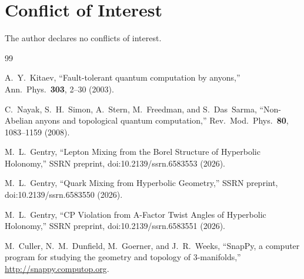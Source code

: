 \documentclass[12pt]{article}
\theoremstyle{definition}
\begin{document}
\section*{Conflict of Interest}
The author declares no conflicts of interest.

\begin{thebibliography}{99}

  A.~Y.~Kitaev,
  ``Fault-tolerant quantum computation by anyons,''
  Ann.\ Phys.\ \textbf{303}, 2--30 (2003).

  C.~Nayak, S.~H.~Simon, A.~Stern, M.~Freedman, and S.~Das~Sarma,
  ``Non-Abelian anyons and topological quantum computation,''
  Rev.\ Mod.\ Phys.\ \textbf{80}, 1083--1159 (2008).

  M.~L.~Gentry,
  ``Lepton Mixing from the Borel Structure of Hyperbolic Holonomy,''
  SSRN preprint, doi:10.2139/ssrn.6583553 (2026).

  M.~L.~Gentry,
  ``Quark Mixing from Hyperbolic Geometry,''
  SSRN preprint, doi:10.2139/ssrn.6583550 (2026).

  M.~L.~Gentry,
  ``CP Violation from A-Factor Twist Angles of Hyperbolic Holonomy,''
  SSRN preprint, doi:10.2139/ssrn.6583551 (2026).

  M.~Culler, N.~M.~Dunfield, M.~Goerner, and J.~R.~Weeks,
  ``SnapPy, a computer program for studying the geometry and
  topology of 3-manifolds,''
  \url{http://snappy.computop.org}.

\end{thebibliography}
\end{document}
